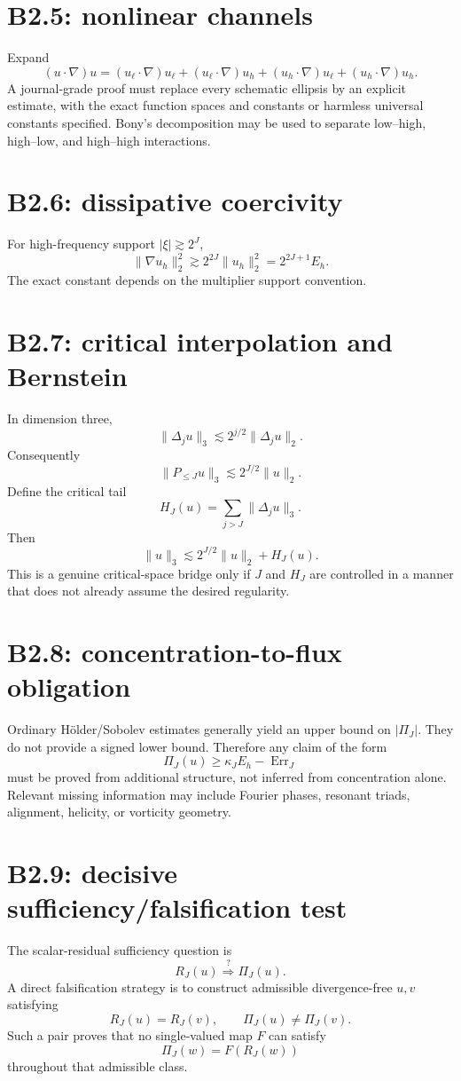 \documentclass[11pt]{article}
\begin{document}
\section{B2.5: nonlinear channels}
Expand
\[
(u\cdot\nabla)u
=(u_\ell\cdot\nabla)u_\ell
+(u_\ell\cdot\nabla)u_h
+(u_h\cdot\nabla)u_\ell
+(u_h\cdot\nabla)u_h.
\]
A journal-grade proof must replace every schematic ellipsis by an explicit estimate, with the exact function spaces and constants or harmless universal constants specified. Bony's decomposition may be used to separate low--high, high--low, and high--high interactions.

\section{B2.6: dissipative coercivity}
For high-frequency support $|\xi|\gtrsim2^J$,
\[
\|\nabla u_h\|_2^2\gtrsim2^{2J}\|u_h\|_2^2
=2^{2J+1}E_h.
\]
The exact constant depends on the multiplier support convention.

\section{B2.7: critical interpolation and Bernstein}
In dimension three,
\[
\|\Delta_j u\|_3\lesssim 2^{j/2}\|\Delta_j u\|_2.
\]
Consequently
\[
\|P_{\le J}u\|_3\lesssim2^{J/2}\|u\|_2.
\]
Define the critical tail
\[
H_J(u)=\sum_{j>J}\|\Delta_j u\|_3.
\]
Then
\begin{equation}
\|u\|_3\lesssim2^{J/2}\|u\|_2+H_J(u).
\end{equation}
This is a genuine critical-space bridge only if $J$ and $H_J$ are controlled in a manner that does not already assume the desired regularity.

\section{B2.8: concentration-to-flux obligation}
Ordinary H\"older/Sobolev estimates generally yield an upper bound on $|\Pi_J|$. They do not provide a signed lower bound. Therefore any claim of the form
\[
\Pi_J(u)\ge \kappa_J E_h-\operatorname{Err}_J
\]
must be proved from additional structure, not inferred from concentration alone. Relevant missing information may include Fourier phases, resonant triads, alignment, helicity, or vorticity geometry.

\section{B2.9: decisive sufficiency/falsification test}
The scalar-residual sufficiency question is
\[
R_J(u)\stackrel{?}{\Longrightarrow}\Pi_J(u).
\]
A direct falsification strategy is to construct admissible divergence-free $u,v$ satisfying
\[
R_J(u)=R_J(v),
\qquad
\Pi_J(u)\ne\Pi_J(v).
\]
Such a pair proves that no single-valued map $F$ can satisfy
\[
\Pi_J(w)=F(R_J(w))
\]
throughout that admissible class.
\end{document}
